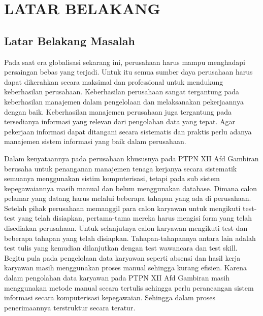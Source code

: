 \documentclass{jtetiproposalskripsi}
\begin{document}
\tableofcontents
{}
\clearpage{}\setcounter{page}{1}

\chapter{LATAR BELAKANG}

\section{Latar Belakang Masalah}
Pada saat era globalisasi sekarang ini, perusahaan harus mampu menghadapi persaingan bebas yang terjadi. Untuk itu semua sumber daya perusahaan harus dapat dikerahkan secara maksimal dan professional untuk mendukung keberhasilan perusahaan. Keberhasilan perusahaan sangat tergantung pada keberhasilan manajemen dalam pengelolaan dan melaksanakan pekerjaannya dengan baik. Keberhasilan manajemen perusahaan juga tergantung pada tersedianya informasi yang relevan dari pengolahan data yang tepat. Agar pekerjaan informasi dapat ditangani secara sistematis dan praktis perlu adanya manajemen sistem informasi yang baik dalam perusahaan. 

Dalam kenyataannya pada perusahaan khususnya pada PTPN XII Afd Gambiran berusaha untuk penanganan manajemen tenaga kerjanya secara sistematik semuanya menggunakan sistim komputerisasi, tetapi pada sub sistem kepegawaiannya masih manual dan belum menggunakan database. Dimana calon pelamar yang datang harus melalui beberapa tahapan yang ada di perusahaan. Setelah pihak perusahaan memanggil para calon karyawan untuk mengikuti test-test yang telah disiapkan, pertama-tama mereka harus mengisi form yang telah disediakan perusahaan. Untuk selanjutnya calon karyawan mengikuti test dan beberapa tahapan yang telah disiapkan. Tahapan-tahapannya antara lain adalah test tulis yang kemudian dilanjutkan dengan test wawancara dan test skill. Begitu pula pada pengelolaan data karyawan seperti absensi dan hasil kerja karyawan masih menggunakan proses manual sehingga kurang efisien. Karena dalam pengolahan data karyawan pada PTPN XII Afd Gambiran masih menggunakan metode manual secara tertulis sehingga perlu perancangan sistem informasi secara komputerisasi kepegawaian. Sehingga dalam proses penerimaannya terstruktur secara teratur. 
\end{document}
